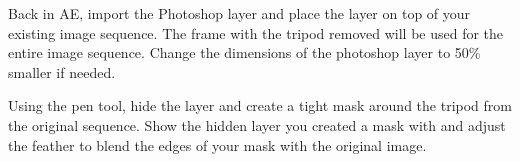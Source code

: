 \begin{fullwidth}

Back in AE, import the Photoshop layer and place the layer on top of your existing image sequence. The frame with the tripod removed will be used for the entire image sequence. Change the dimensions of the photoshop layer to 50\% smaller if needed.

Using the pen tool, hide the layer and create a tight mask around the tripod from the original sequence. Show the hidden layer you created a mask with and adjust the feather to blend the edges of your mask with the original image.


\clearpage
\end{fullwidth}